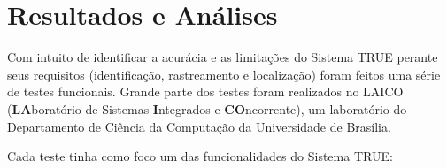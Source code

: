 \chapter{Resultados e Análises}
\label{cap:testes}


	Com intuito de identificar a acurácia e as limitações do Sistema TRUE perante seus requisitos (identificação, rastreamento e localização) foram feitos uma série de testes funcionais. Grande parte dos testes foram realizados no LAICO (\textbf{LA}boratório de Sistemas \textbf{I}ntegrados e \textbf{CO}ncorrente), um laboratório do Departamento de Ciência da Computação da Universidade de Brasília. 



	Cada teste tinha como foco um das funcionalidades do Sistema TRUE:

